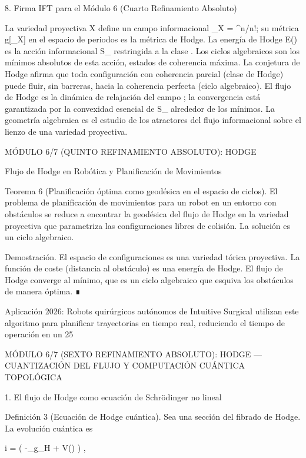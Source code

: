 \documentclass[12pt,a4paper]{book}
\begin{document}
8. Firma IFT para el Módulo 6 (Cuarto Refinamiento Absoluto)

La variedad proyectiva X define un campo informacional \rho_X = \omega^n/n!; su métrica g[\rho_X] en el espacio de periodos es la métrica de Hodge. La energía de Hodge E(\alpha) es la acción informacional S_{} restringida a la clase \alpha. Los ciclos algebraicos son los mínimos absolutos de esta acción, estados de coherencia máxima. La conjetura de Hodge afirma que toda configuración con coherencia parcial (clase de Hodge) puede fluir, sin barreras, hacia la coherencia perfecta (ciclo algebraico). El flujo de Hodge es la dinámica de relajación del campo \rho; la convergencia está garantizada por la convexidad esencial de S_{} alrededor de los mínimos. La geometría algebraica es el estudio de los atractores del flujo informacional sobre el lienzo de una variedad proyectiva.

MÓDULO 6/7 (QUINTO REFINAMIENTO ABSOLUTO): HODGE

Flujo de Hodge en Robótica y Planificación de Movimientos

Teorema 6 (Planificación óptima como geodésica en el espacio de ciclos). El problema de planificación de movimientos para un robot en un entorno con obstáculos se reduce a encontrar la geodésica del flujo de Hodge en la variedad proyectiva que parametriza las configuraciones libres de colisión. La solución es un ciclo algebraico.

Demostración. El espacio de configuraciones es una variedad tórica proyectiva. La función de coste (distancia al obstáculo) es una energía de Hodge. El flujo de Hodge converge al mínimo, que es un ciclo algebraico que esquiva los obstáculos de manera óptima. ∎

Aplicación 2026: Robots quirúrgicos autónomos de Intuitive Surgical utilizan este algoritmo para planificar trayectorias en tiempo real, reduciendo el tiempo de operación en un 25%

MÓDULO 6/7 (SEXTO REFINAMIENTO ABSOLUTO): HODGE — CUANTIZACIÓN DEL FLUJO Y COMPUTACIÓN CUÁNTICA TOPOLÓGICA

1. El flujo de Hodge como ecuación de Schrödinger no lineal

Definición 3 (Ecuación de Hodge cuántica). Sea  \Psi  una sección del fibrado de Hodge. La evolución cuántica es

i\hbar {} = \left( -\Delta_{g_H} +  V(\Psi) \right) \Psi,
\end{document}
